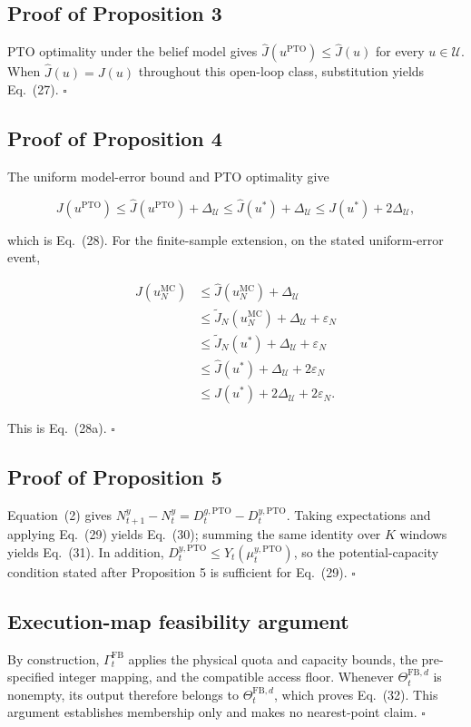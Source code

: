 \documentclass[preprint,12pt,authoryear,a4paper]{elsarticle}
\begin{document}
\subsection*{Proof of Proposition 3}

PTO optimality under the belief model gives \(\widehat J(u^{\mathrm{PTO}})\le\widehat J(u)\) for every \(u\in\mathcal U\). When \(\widehat J(u)=J(u)\) throughout this open-loop class, substitution yields Eq.~(27). \(\square\)

\subsection*{Proof of Proposition 4}

The uniform model-error bound and PTO optimality give

\[
J(u^{\mathrm{PTO}})
\le \widehat J(u^{\mathrm{PTO}})+\Delta_{\mathcal U}
\le \widehat J(u^*)+\Delta_{\mathcal U}
\le J(u^*)+2\Delta_{\mathcal U},
\]

which is Eq.~(28). For the finite-sample extension, on the stated uniform-error event,

\[
\begin{aligned}
J(u_N^{\mathrm{MC}})
&\le \widehat J(u_N^{\mathrm{MC}})+\Delta_{\mathcal U}\\
&\le \widetilde J_N(u_N^{\mathrm{MC}})+\Delta_{\mathcal U}+\varepsilon_N\\
&\le \widetilde J_N(u^*)+\Delta_{\mathcal U}+\varepsilon_N\\
&\le \widehat J(u^*)+\Delta_{\mathcal U}+2\varepsilon_N\\
&\le J(u^*)+2\Delta_{\mathcal U}+2\varepsilon_N.
\end{aligned}
\]

This is Eq.~(28a). \(\square\)

\subsection*{Proof of Proposition 5}

Equation~(2) gives \(N_{t+1}^y-N_t^y=D_t^{g,\mathrm{PTO}}-D_t^{y,\mathrm{PTO}}\). Taking expectations and applying Eq.~(29) yields Eq.~(30); summing the same identity over \(K\) windows yields Eq.~(31). In addition, \(D_t^{y,\mathrm{PTO}}\le Y_t(\mu_t^{y,\mathrm{PTO}})\), so the potential-capacity condition stated after Proposition 5 is sufficient for Eq.~(29). \(\square\)

\subsection*{Execution-map feasibility argument}

By construction, \(\Gamma_t^{\mathrm{FB}}\) applies the physical quota and capacity bounds, the pre-specified integer mapping, and the compatible access floor. Whenever \(\Theta_t^{\mathrm{FB},d}\) is nonempty, its output therefore belongs to \(\Theta_t^{\mathrm{FB},d}\), which proves Eq.~(32). This argument establishes membership only and makes no nearest-point claim. \(\square\)



\end{document}
